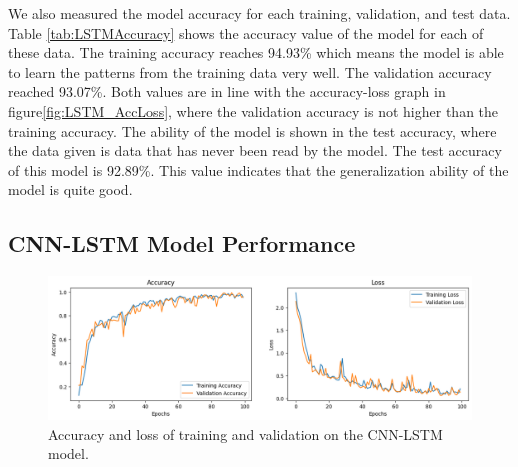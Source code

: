 We also measured the model accuracy for each training, validation, and test data. Table \ref{tab:LSTMAccuracy} shows the accuracy value of the model for each of these data. The training accuracy reaches 94.93\% which means the model is able to learn the patterns from the training data very well. The validation accuracy reached 93.07\%. Both values are in line with the accuracy-loss graph in figure\ref{fig:LSTM_AccLoss}, where the validation accuracy is not higher than the training accuracy. The ability of the model is shown in the test accuracy, where the data given is data that has never been read by the model. The test accuracy of this model is 92.89\%. This value indicates that the generalization ability of the model is quite good.

\subsection{CNN-LSTM Model Performance}
\label{subsec4:CNNLSTMPerformance}

\begin{figure}[h!]
	\centering
	\includegraphics[width=1\textwidth]{bab4/ar_CNNLSTM_AccLoss.png}
	\caption{Accuracy and loss of training and validation on the CNN-LSTM model.}
	\label{fig:CNNLSTM_AccLoss}
\end{figure}

